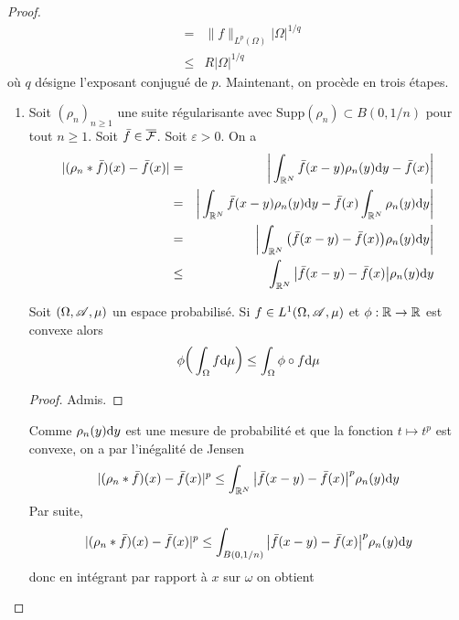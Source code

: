 \begin{proof}
\begin{eqnarray*}
        &=& \|f\|_{L^p(\Omega)} |\Omega|^{1/q} \\
        &\leq& R|\Omega|^{1/q}
    \end{eqnarray*}
    où $q$ désigne l'exposant conjugué de $p$. Maintenant, on procède en trois étapes.
    \begin{enumerate}
        \item Soit $(\rho_n)_{n \geq 1}$ une suite régularisante avec $\mathrm{Supp}(\rho_n) \subset B(0,1/n)$ pour tout $n \geq 1$. Soit $\bar{f} \in \overline{\mathcal{F}}$. Soit $\varepsilon >0$. On a 
        \begin{eqnarray*}
            |(\rho_n*\bar{f})(x)-\bar{f}(x)| &=& \bigg| \int_{\mathbb{R}^N}\bar{f}(x-y)\rho_n(y)\mathrm{d} y - \bar{f}(x)\bigg| \\
            &=& \bigg| \int_{\mathbb{R}^N}\bar{f}(x-y)\rho_n(y)\mathrm{d} y - \bar{f}(x)\int_{\mathbb{R}^N}\rho_n(y)\mathrm{d} y\bigg| \\
            &=& \bigg|\int_{\mathbb{R}^N}\big(\bar{f}(x-y)-\bar{f}(x)\big)\rho_n(y)\mathrm{d} y\bigg| \\
            &\leq& \int_{\mathbb{R}^N}\big|\bar{f}(x-y)-\bar{f}(x)\big|\rho_n(y)\mathrm{d} y
        \end{eqnarray*}
        \begin{lemme}
            Soit $(\Omega, \mathscr{A}, \mu)$ un espace probabilisé. Si $f \in L^1(\Omega, \mathscr{A}, \mu)$ et $\phi : \mathbb{R} \rightarrow \mathbb{R}$ est convexe alors 
            \begin{equation*}
                \phi\bigg(\int_{\Omega}f\mathrm{d}\mu\bigg) \leq \int_{\Omega} \phi \circ f \mathrm{d} \mu
            \end{equation*}
        \end{lemme}
        \begin{proof}
            Admis.
        \end{proof}
        Comme $\rho_n(y)\mathrm{d} y$ est une mesure de probabilité et que la fonction $t \mapsto t^p$ est convexe, on a par l'inégalité de Jensen 
        \begin{equation*}
            |(\rho_n*\bar{f})(x)-\bar{f}(x)|^p \leq \int_{\mathbb{R}^N}\big|\bar{f}(x-y)-\bar{f}(x)\big|^p\rho_n(y)\mathrm{d} y
        \end{equation*}
        Par suite,
        \begin{equation*}
            |(\rho_n*\bar{f})(x)-\bar{f}(x)|^p \leq \int_{B(0,1/n)}\big|\bar{f}(x-y)-\bar{f}(x)\big|^p\rho_n(y)\mathrm{d} y
        \end{equation*}
        donc en intégrant par rapport à $x$ sur $\omega$ on obtient 
        \begin{equation*}

\end{equation*}
\end{enumerate}
\end{proof}
